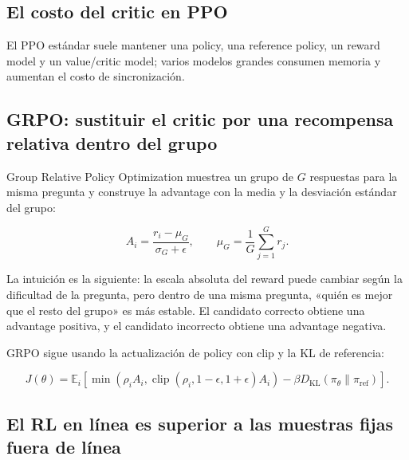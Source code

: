 \documentclass[a4paper]{article}
\begin{document}
\subsection{El costo del critic en PPO}

El PPO estándar suele mantener una policy, una reference policy, un reward model y un value/critic model; varios modelos grandes consumen memoria y aumentan el costo de sincronización.


\subsection{GRPO: sustituir el critic por una recompensa relativa dentro del grupo}

Group Relative Policy Optimization muestrea un grupo de $G$ respuestas para la misma pregunta y construye la advantage con la media y la desviación estándar del grupo:

$$
A_i=\frac{r_i-\mu_G}{\sigma_G+\epsilon},
\qquad
\mu_G=\frac{1}{G}\sum_{j=1}^{G}r_j.
$$


La intuición es la siguiente: la escala absoluta del reward puede cambiar según la dificultad de la pregunta, pero dentro de una misma pregunta, «quién es mejor que el resto del grupo» es más estable. El candidato correcto obtiene una advantage positiva, y el candidato incorrecto obtiene una advantage negativa.

GRPO sigue usando la actualización de policy con clip y la KL de referencia:

$$
J(\theta)=\mathbb E_i\left[
\min(\rho_i A_i,\operatorname{clip}(\rho_i,1-\epsilon,1+\epsilon)A_i)
-\beta D_{\mathrm{KL}}(\pi_\theta\|\pi_{\mathrm{ref}})
\right].
$$


\subsection{El RL en línea es superior a las muestras fijas fuera de línea}
\end{document}
